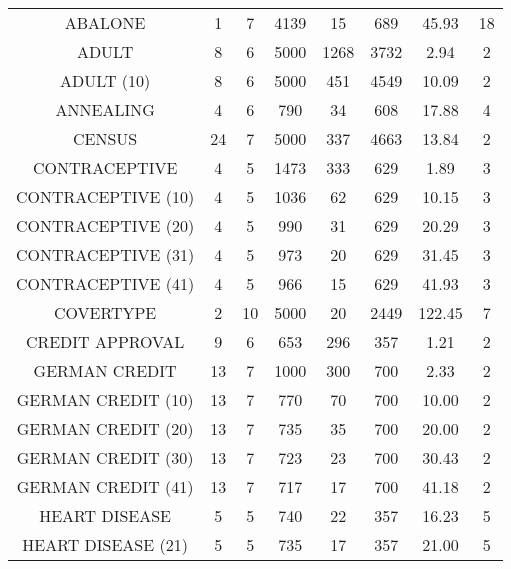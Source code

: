 \begin{longtable}{cccccccc}
\bottomrule
\endlastfoot
           ABALONE &       1 &           7 &  4139 &         15 &        689 &  45.93 &       18 \\
             ADULT &       8 &           6 &  5000 &       1268 &       3732 &   2.94 &        2 \\
        ADULT (10) &       8 &           6 &  5000 &        451 &       4549 &  10.09 &        2 \\
         ANNEALING &       4 &           6 &   790 &         34 &        608 &  17.88 &        4 \\
            CENSUS &      24 &           7 &  5000 &        337 &       4663 &  13.84 &        2 \\
     CONTRACEPTIVE &       4 &           5 &  1473 &        333 &        629 &   1.89 &        3 \\
CONTRACEPTIVE (10) &       4 &           5 &  1036 &         62 &        629 &  10.15 &        3 \\
CONTRACEPTIVE (20) &       4 &           5 &   990 &         31 &        629 &  20.29 &        3 \\
CONTRACEPTIVE (31) &       4 &           5 &   973 &         20 &        629 &  31.45 &        3 \\
CONTRACEPTIVE (41) &       4 &           5 &   966 &         15 &        629 &  41.93 &        3 \\
         COVERTYPE &       2 &          10 &  5000 &         20 &       2449 & 122.45 &        7 \\
   CREDIT APPROVAL &       9 &           6 &   653 &        296 &        357 &   1.21 &        2 \\
     GERMAN CREDIT &      13 &           7 &  1000 &        300 &        700 &   2.33 &        2 \\
GERMAN CREDIT (10) &      13 &           7 &   770 &         70 &        700 &  10.00 &        2 \\
GERMAN CREDIT (20) &      13 &           7 &   735 &         35 &        700 &  20.00 &        2 \\
GERMAN CREDIT (30) &      13 &           7 &   723 &         23 &        700 &  30.43 &        2 \\
GERMAN CREDIT (41) &      13 &           7 &   717 &         17 &        700 &  41.18 &        2 \\
     HEART DISEASE &       5 &           5 &   740 &         22 &        357 &  16.23 &        5 \\
HEART DISEASE (21) &       5 &           5 &   735 &         17 &        357 &  21.00 &        5 \\

\end{longtable}
